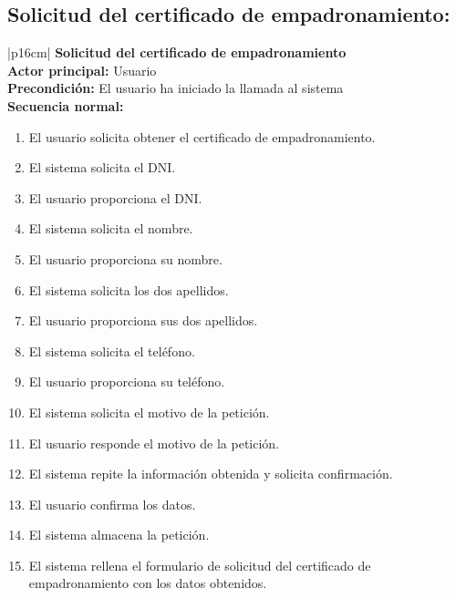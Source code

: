     \subsection{Solicitud del certificado de empadronamiento:}
        \begin{longtable}{|p{16cm}|} 
        \hline
        \textbf{Solicitud del certificado de empadronamiento} \\ \hline
        \textbf{Actor principal:} Usuario \\ \hline
        \textbf{Precondición:} El usuario ha iniciado la llamada al sistema \\ \hline
        \textbf{Secuencia normal:} \\
        \begin{minipage}[t]{\linewidth}
            \begin{enumerate}
                \item El usuario solicita obtener el certificado de empadronamiento.
                \item El sistema solicita el DNI.
                \item El usuario proporciona el DNI.
                \item El sistema solicita el nombre.
                \item El usuario proporciona su nombre.
                \item El sistema solicita los dos apellidos.
                \item El usuario proporciona sus dos apellidos.
                \item El sistema solicita el teléfono.
                \item El usuario proporciona su teléfono.
                \item El sistema solicita el motivo de la petición.
                \item El usuario responde el motivo de la petición.
                \item El sistema repite la información obtenida y solicita confirmación. 
                \item El usuario confirma los datos.
                \item El sistema almacena la petición.
                \item El sistema rellena el formulario de solicitud del certificado de empadronamiento con los datos obtenidos.
            \end{enumerate}
            \vspace{1mm}

\end{minipage}
\end{longtable}
